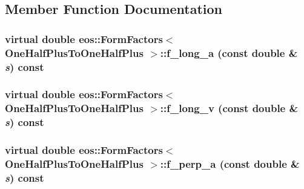 \subsection{Member Function Documentation}
\hypertarget{classeos_1_1FormFactors_3_01OneHalfPlusToOneHalfPlus_01_4_a1864b61e70ad83bed15695a5726a764a}{
\subsubsection[{f\_\-long\_\-a}]{\setlength{\rightskip}{0pt plus 5cm}virtual double eos::FormFactors$<$ {\bf OneHalfPlusToOneHalfPlus} $>$::f\_\-long\_\-a (const double \& {\em s}) const}}
\label{classeos_1_1FormFactors_3_01OneHalfPlusToOneHalfPlus_01_4_a1864b61e70ad83bed15695a5726a764a}
\hypertarget{classeos_1_1FormFactors_3_01OneHalfPlusToOneHalfPlus_01_4_a290adf860a3a7a206f9b74af824735ec}{
\subsubsection[{f\_\-long\_\-v}]{\setlength{\rightskip}{0pt plus 5cm}virtual double eos::FormFactors$<$ {\bf OneHalfPlusToOneHalfPlus} $>$::f\_\-long\_\-v (const double \& {\em s}) const}}
\label{classeos_1_1FormFactors_3_01OneHalfPlusToOneHalfPlus_01_4_a290adf860a3a7a206f9b74af824735ec}
\hypertarget{classeos_1_1FormFactors_3_01OneHalfPlusToOneHalfPlus_01_4_adf134b63172b8dc387be13e7cf576e4c}{
\subsubsection[{f\_\-perp\_\-a}]{\setlength{\rightskip}{0pt plus 5cm}virtual double eos::FormFactors$<$ {\bf OneHalfPlusToOneHalfPlus} $>$::f\_\-perp\_\-a (const double \& {\em s}) const}}
